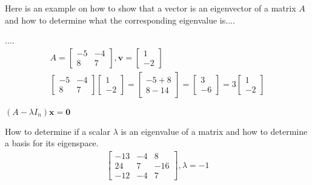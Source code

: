 Here is an example on how to show that a vector is an eigenvector of a matrix $A$ and how to determine what the corresponding eigenvalue is.... 
\begin{example}
....
\begin{align*}
A = \begin{bmatrix}-5 & -4 \\8 & 7 \end{bmatrix}, \textbf{v} =\begin{bmatrix}1 \\-2\end{bmatrix}\\
\begin{bmatrix}-5 & -4 \\8 & 7 \end{bmatrix} \begin{bmatrix}1 \\-2\end{bmatrix} = \begin{bmatrix}-5 + 8 \\8  -14 \end{bmatrix} = \begin{bmatrix}3 \\-6 \end{bmatrix} = 3\begin{bmatrix}1\\-2 \end{bmatrix}
\end{align*}
\end{example}

$(A-\lambda I_n)\textbf{x}=\textbf{0}$

\begin{example}
How to determine if a scalar $\lambda$ is an eigenvalue of a matrix and how to determine a basis for its eigenspace.  
\begin{align*}
\begin{bmatrix}
    -13 & -4 & 8\\
    24 & 7 & -16\\
    -12 & -4 & 7
\end{bmatrix}, \lambda=-1
\end{align*}

\end{example}
